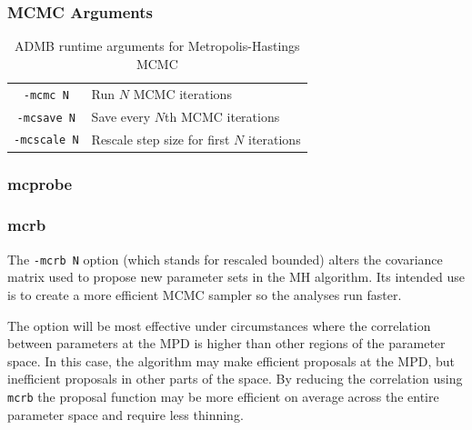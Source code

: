 \documentclass{article}\usepackage[]{graphicx}\usepackage[]{color}
\begin{document}
\subsubsection{MCMC Arguments}
\begin{table}[h]
  \centering
  \begin{tabular}[h]{|cl|}
    \hline
    \texttt{-mcmc N} & Run $N$ MCMC iterations\\
    \texttt{-mcsave N} & Save every $N$th MCMC iterations\\
    \texttt{-mcscale N} & Rescale step size for first $N$ iterations\\
    \hline
  \end{tabular}
  \caption{ADMB runtime arguments for Metropolis-Hastings MCMC}
  \label{tab:mh_args}
\end{table}
\subsubsection{mcprobe}

\subsubsection{mcrb}
The \texttt{-mcrb N} option (which stands for rescaled
bounded) alters the covariance matrix used to propose new
parameter sets in the MH algorithm. Its intended use is to
create a more efficient MCMC sampler so the analyses run
faster.

The option will be most effective under circumstances where
the correlation between parameters at the MPD is higher than
other regions of the parameter space. In this case, the
algorithm may make efficient proposals at the MPD, but
inefficient proposals in other parts of the space. By
reducing the correlation using \texttt{mcrb} the proposal
function may be more efficient on average across the entire
parameter space and require less thinning.
\end{document}
